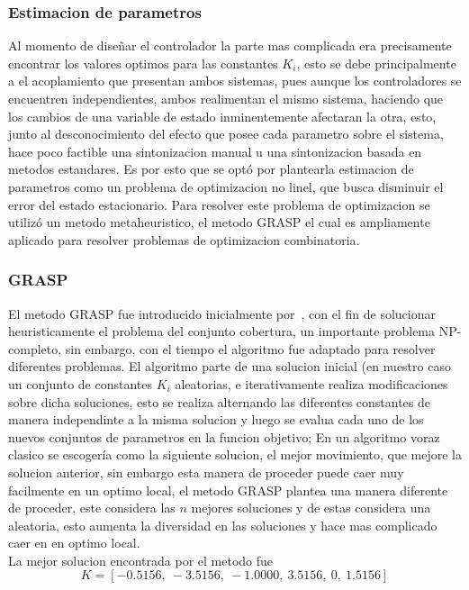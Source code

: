 \subsubsection{Estimacion de parametros}
Al momento de diseñar el controlador la parte mas complicada era precisamente encontrar los
valores optimos para las constantes $K_i$, esto se debe principalmente a el acoplamiento que
presentan ambos sistemas, pues aunque los controladores se encuentren independientes, ambos
realimentan el mismo sistema, haciendo que los cambios de una variable de estado
inminentemente afectaran la otra, esto, junto al desconocimiento del efecto que posee cada
parametro sobre el sistema, hace poco factible una sintonizacion manual u una sintonizacion
basada en metodos estandares. Es por esto que se optó por plantearla estimacion de parametros
como un problema de optimizacion no linel, que busca disminuir el error del estado
estacionario.
Para resolver este problema de optimizacion se utilizó un metodo metaheuristico, el metodo
GRASP el cual es ampliamente aplicado para resolver problemas de optimizacion combinatoria.
\subsubsection{GRASP}
El metodo GRASP fue introducido inicialmente por~\citet{Feo1989}, con el fin de solucionar
heuristicamente el problema del conjunto cobertura, un importante problema NP-completo,
sin embargo, con el tiempo el algoritmo fue adaptado para resolver diferentes problemas.
El algoritmo parte de una solucion inicial (en nuestro caso un conjunto de constantes $K_i$
aleatorias, e iterativamente realiza modificaciones sobre dicha soluciones, esto se realiza
alternando las diferentes constantes de manera independinte a la misma solucion y luego se
evalua cada uno de los nuevos conjuntos de parametros en la funcion objetivo; En un algoritmo
voraz clasico se escogería como la siguiente solucion, el mejor movimiento, que mejore la solucion
anterior, sin embargo esta manera de proceder puede caer muy facilmente en un optimo local, el metodo
GRASP plantea una manera diferente de proceder, este considera las $n$ mejores soluciones y de estas
considera una aleatoria, esto aumenta la diversidad en las soluciones y hace mas complicado caer en
en optimo local.\\
La mejor solucion encontrada por el metodo fue
\[K = [-0.5156,\   -3.5156,\   -1.0000,\    3.5156,\         0,\    1.5156]\]

